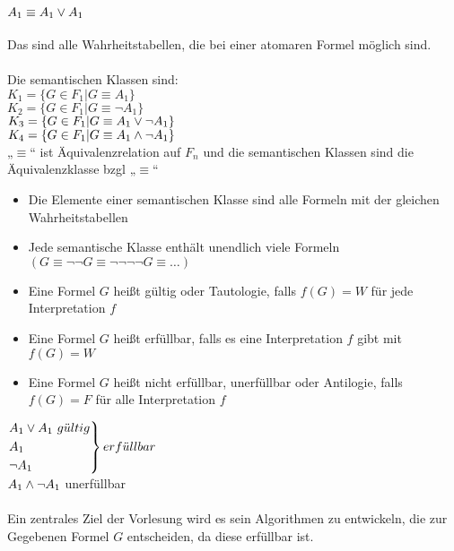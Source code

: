 \noindent\\
$A_1 \equiv A_1 \vee A_1$\\
\noindent\\
Das sind alle Wahrheitstabellen, die bei einer atomaren Formel möglich sind.\\
\noindent\\
Die semantischen Klassen sind:\\
$K_1 = \{G \in F_1 | G \equiv A_1\}$\\
$K_2 = \{G \in F_1 | G \equiv \neg A_1\}$\\
$K_3 = \{G \in F_1 | G \equiv A_1 \vee \neg A_1\}$\\
$K_4 = \{G \in F_1 | G \equiv A_1 \wedge \neg A_1\}$\\
    
\bemerkung{}
„$\equiv$“ ist Äquivalenzrelation auf $F_n$ und die semantischen Klassen sind die Äquivalenzklasse bzgl „$\equiv$“\\
    
\bemerkung{}
\begin{itemize}
\item Die Elemente einer semantischen Klasse sind alle Formeln mit der gleichen Wahrheitstabellen
\item Jede semantische Klasse enthält unendlich viele Formeln\\
    $(G \equiv \neg \neg G \equiv \neg \neg \neg \neg G \equiv … )$
\end{itemize}

\begin{itemize}
\item Eine Formel $G$ heißt gültig oder Tautologie, falls $f(G) = W$ für jede Interpretation $f$
\item Eine Formel $G$ heißt erfüllbar, falls es eine Interpretation $f$ gibt mit $f(G) = W$
\item Eine Formel $G$ heißt nicht erfüllbar, unerfüllbar oder Antilogie, falls $f(G) = F$ für alle Interpretation $f$
\end{itemize}

\beispiel{}
$\begin{rcases} A_1 \vee A_1\ g\ddot{u}ltig \\ A_1 \\ \neg A_1 \end{rcases} erf\ddot{u}llbar$\\
$A_1 \wedge \neg A_1$ unerfüllbar\\

\noindent\\
Ein zentrales Ziel der Vorlesung wird es sein Algorithmen zu entwickeln, die zur Gegebenen Formel $G$ entscheiden, da diese erfüllbar ist.\\
    
